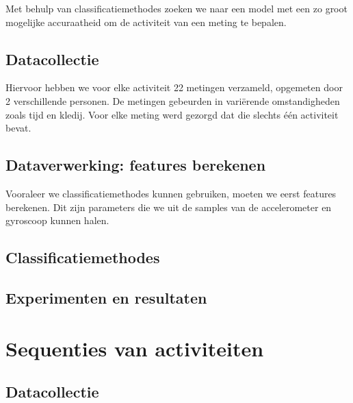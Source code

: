 \documentclass{article}
\begin{document}
Met behulp van classificatiemethodes zoeken we naar een model met een zo groot mogelijke accuraatheid om de activiteit van een meting te bepalen.


\subsection{Datacollectie}

Hiervoor hebben we voor elke activiteit 22 metingen verzameld, opgemeten door 2 verschillende personen. De metingen gebeurden in vari\"erende omstandigheden zoals tijd en kledij. Voor elke meting werd gezorgd dat die slechts \'e\'en activiteit bevat.

\subsection{Dataverwerking: features berekenen}

Vooraleer we classificatiemethodes kunnen gebruiken, moeten we eerst features berekenen. Dit zijn parameters die we uit de samples van de accelerometer en gyroscoop kunnen halen. 


\subsection{Classificatiemethodes}


\subsection{Experimenten en resultaten}


\section{Sequenties van activiteiten}


\subsection{Datacollectie}
\end{document}
